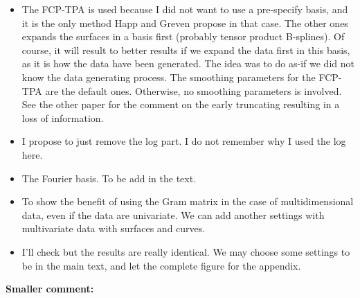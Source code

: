 \documentclass[11pt]{article}
\begin{document}
\begin{itemize}
  \item The FCP-TPA is used because I did not want to use a pre-specify basis, and it is the only method Happ and Greven propose in that case. The other ones expands the surfaces in a basis first (probably tensor product B-splines). Of course, it will result to better results if we expand the data first in this basis, as it is how the data have been generated. The idea was to do as-if we did not know the data generating process.
  The smoothing parameters for the FCP-TPA are the default ones. Otherwise, no smoothing parameters is involved. See the other paper for the comment on the early truncating resulting in a loss of information. 
  \item I propose to just remove the log part. I do not remember why I used the log here.
  \item The Fourier basis. To be add in the text.
  \item To show the benefit of using the Gram matrix in the case of multidimensional data, even if the data are univariate. We can add another settings with multivariate data with surfaces and curves.
  \item I'll check but the results are really identical. We may choose some settings to be in the main text, and let the complete figure for the appendix. 
\end{itemize}


\bigskip


\itshape


\textbf{Smaller comment:}
\end{document}
